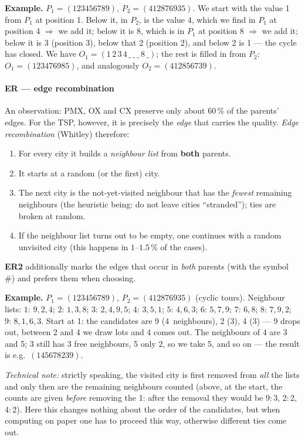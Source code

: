 \documentclass[11pt,a4paper]{article}
\theoremstyle{definition}
\providecommand{\uv}[1]{``#1''}
\begin{document}
\textbf{Example.} $P_1 = (123456789)$, $P_2 = (412876935)$.
We start with the value 1 from $P_1$ at position 1. Below it, in $P_2$, is the
value 4, which we find in $P_1$ at position 4 $\Rightarrow$ we add it; below it
is 8, which is in $P_1$ at position 8 $\Rightarrow$ we add it; below it is 3
(position 3), below that 2 (position 2), and below 2 is 1 --- the cycle has
closed. We have $O_1 = (1\,2\,3\,4\,\_\,\_\,\_\,8\,\_)$; the rest is filled in
from $P_2$: $O_1 = (123476985)$, and analogously $O_2 = (412856739)$.

\paragraph{ER --- edge recombination}

An observation: PMX, OX and CX preserve only about $60\,\%$ of the parents'
edges. For the TSP, however, it is precisely the \emph{edge} that carries the
quality. \emph{Edge recombination} (Whitley) therefore:
\begin{enumerate}
\item For every city it builds a \emph{neighbour list} from \textbf{both}
  parents.
\item It starts at a random (or the first) city.
\item The next city is the not-yet-visited neighbour that has the \emph{fewest}
  remaining neighbours (the heuristic being: do not leave cities
  \uv{stranded}); ties are broken at random.
\item If the neighbour list turns out to be empty, one continues with a random
  unvisited city (this happens in $1$--$1.5\,\%$ of the cases).
\end{enumerate}
\textbf{ER2} additionally marks the edges that occur in \emph{both} parents
(with the symbol \#) and prefers them when choosing.

\textbf{Example.} $P_1 = (123456789)$, $P_2 = (412876935)$ (cyclic tours).
Neighbour lists: $1{:}\,9,2,4$; $2{:}\,1,3,8$; $3{:}\,2,4,9,5$; $4{:}\,3,5,1$;
$5{:}\,4,6,3$; $6{:}\,5,7,9$; $7{:}\,6,8$; $8{:}\,7,9,2$; $9{:}\,8,1,6,3$.
Start at 1: the candidates are 9 (4~neighbours), 2 (3), 4 (3) --- 9 drops out,
between 2 and 4 we draw lots and 4 comes out. The neighbours of 4 are 3 and 5;
3 still has 3 free neighbours, 5 only 2, so we take 5, and so on --- the result
is e.g.\ $(145678239)$.

\emph{Technical note:} strictly speaking, the visited city is first removed from
\emph{all} the lists and only then are the remaining neighbours counted (above,
at the start, the counts are given \emph{before} removing the 1: after the
removal they would be 9$:$3, 2$:$2, 4$:$2). Here this changes nothing about the
order of the candidates, but when computing on paper one has to proceed this
way, otherwise different ties come out.
\end{document}
